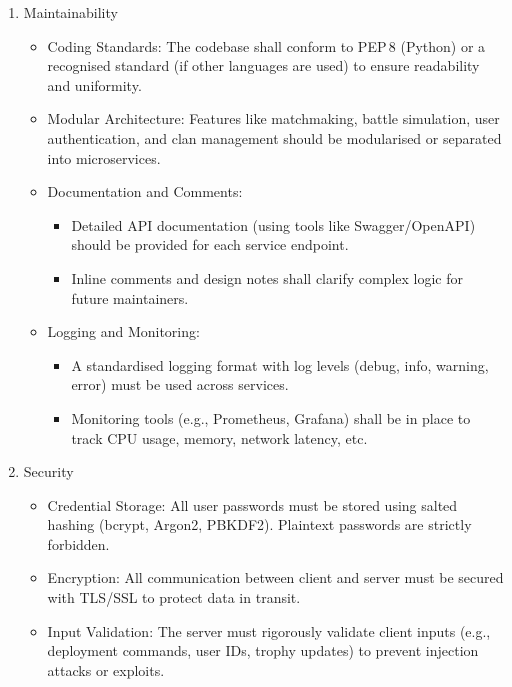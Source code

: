 \documentclass{article}
\begin{document}
\begin{enumerate}[label=\textbf{NFR\arabic*:}]
\begin{itemize}
        \item Database Sharding/Replication: As the player base grows, the database layer should scale by distributing data across multiple nodes or using replication strategies.
    \end{itemize}
    \item Maintainability
    \begin{itemize}
        \item Coding Standards: The codebase shall conform to PEP\,8 (Python) or a recognised standard (if other languages are used) to ensure readability and uniformity.
        \item Modular Architecture: Features like matchmaking, battle simulation, user authentication, and clan management should be modularised or separated into microservices.
        \item Documentation and Comments:
        \begin{itemize}
            \item Detailed API documentation (using tools like Swagger/OpenAPI) should be provided for each service endpoint.
            \item Inline comments and design notes shall clarify complex logic for future maintainers.
        \end{itemize}
        \item Logging and Monitoring:
        \begin{itemize}
            \item A standardised logging format with log levels (debug, info, warning, error) must be used across services.
            \item Monitoring tools (e.g., Prometheus, Grafana) shall be in place to track CPU usage, memory, network latency, etc.
        \end{itemize}
    \end{itemize}
    \item Security
    \begin{itemize}
        \item Credential Storage: All user passwords must be stored using salted hashing (bcrypt, Argon2, PBKDF2). Plaintext passwords are strictly forbidden.
        \item Encryption: All communication between client and server must be secured with TLS/SSL to protect data in transit.
        \item Input Validation: The server must rigorously validate client inputs (e.g., deployment commands, user IDs, trophy updates) to prevent injection attacks or exploits.

\end{itemize}
\end{enumerate}
\end{document}
